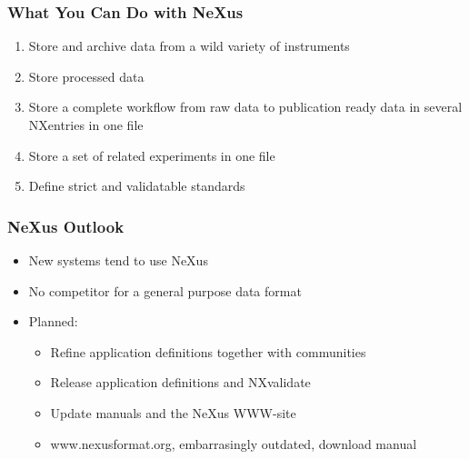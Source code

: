 \documentclass{beamer}
\begin{document}
\begin{frame} \frametitle{What You Can Do with NeXus}
\begin{enumerate}
\item Store and archive data from a wild variety of instruments
\item Store processed data
\item Store a complete workflow from raw data to publication ready data in several 
 NXentries in one file
\item Store a set of related experiments in one file
\item Define strict and validatable standards 
\end{enumerate}
\end{frame}

\begin{frame} \frametitle{NeXus Outlook}
\begin{itemize}
\item New systems tend to use NeXus
\item No competitor for a general purpose data format
\item Planned:
\begin{itemize}
\item Refine application definitions together with communities
\item Release application definitions and NXvalidate
\item Update manuals and the NeXus WWW-site
\item www.nexusformat.org, embarrasingly outdated, download manual
\end{itemize}
\end{itemize}
\end{frame}
\end{document}
